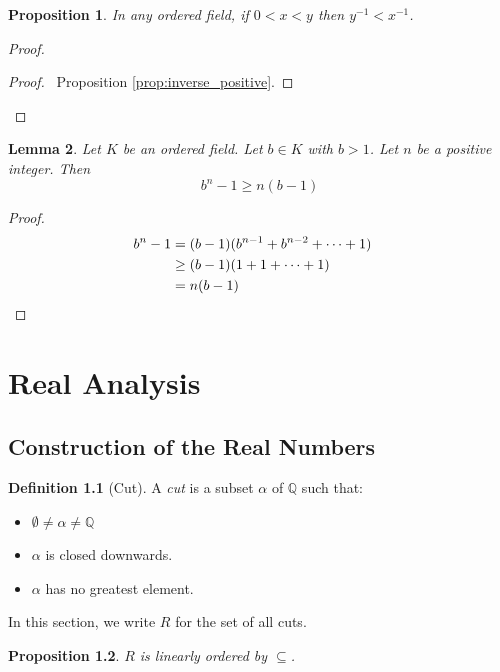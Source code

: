 \documentclass{book}
\let\qed\relax
\newtheorem{prop}{Proposition}[chapter]
\newtheorem{lm}[prop]{Lemma}
\theoremstyle{definition}
\newtheorem{df}[prop]{Definition}
\begin{document}
\begin{prop}
In any ordered field, if $0 < x < y$ then $y^{-1} < x^{-1}$.
\end{prop}

\begin{proof}
\pf
{}
\begin{proof}
	\pf\ Proposition \ref{prop:inverse_positive}.
\end{proof}
\qed
\end{proof}

\begin{lm}
\label{lm:b_to_the_n_minus_1}
Let $K$ be an ordered field. Let $b \in K$ with $b > 1$. Let $n$ be a positive integer. Then
\[ b^n - 1 \geq n(b-1) \]
\end{lm}

\begin{proof}
\pf
\begin{align*}
b^n - 1 & = (b-1) (b^{n-1} + b^{n-2} + \cdots + 1) \\
& \geq (b-1) (1 + 1 + \cdots + 1) \\
& = n(b-1) & \qed
\end{align*}
\end{proof}

\chapter{Real Analysis}

\section{Construction of the Real Numbers}

\begin{df}[Cut]
A \emph{cut} is a subset $\alpha$ of $\mathbb{Q}$ such that:
\begin{itemize}
\item $\emptyset \neq \alpha \neq \mathbb{Q}$
\item $\alpha$ is closed downwards.
\item $\alpha$ has no greatest element.
\end{itemize}
In this section, we write $R$ for the set of all cuts.
\end{df}

\begin{prop}
$R$ is linearly ordered by $\subseteq$.
\end{prop}
\end{document}
